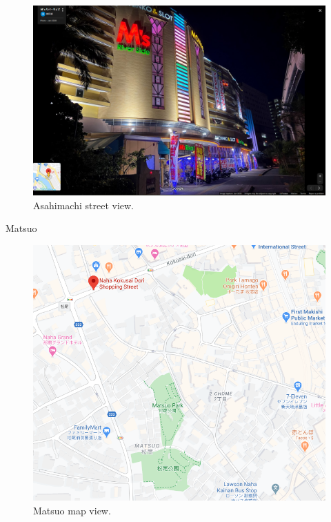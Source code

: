 \documentclass[11pt]{article}
\begin{document}
\begin{figure}[H]
    \centering
        \includegraphics[scale=.4]{figures/asahimachi3.png}
    \caption{Asahimachi street view.}
    \label{fig:1}
\end{figure}

 Matsuo

\begin{figure}[H]
    \centering
        \includegraphics[scale=.4]{figures/matsuo2.png}
    \caption{Matsuo map view.}
    \label{fig:1}
\end{figure}
\end{document}
